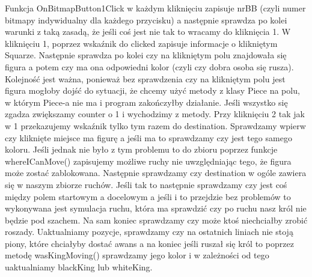 \documentclass[]{report}
\begin{document}
\begin{flushleft}
Funkcja OnBitmapButton1Click w każdym kliknięciu zapisuje nrBB (czyli numer bitmapy indywidualny dla każdego przycisku) a następnie sprawdza po kolei warunki z taką zasadą, że jeśli coś jest nie tak to wracamy do kliknięcia 1. W kliknięciu 1, poprzez wskaźnik do clicked zapisuje informacje o klikniętym Squarze. Następnie sprawdza po kolei czy na klikniętym polu znajdowała się figura a potem czy ma ona odpowiedni kolor (czyli czy dobra osoba się rusza). Kolejność jest ważna, ponieważ bez sprawdzenia czy na klikniętym polu jest figura mogłoby dojść do sytuacji, że chcemy użyć metody z klasy Piece na polu, w którym Piece-a nie ma i program zakończyłby działanie. Jeśli wszystko się zgadza zwiększamy counter o 1 i wychodzimy z metody. Przy kliknięciu 2 tak jak w 1 przekazujemy wskaźnik tylko tym razem do destination. Sprawdzamy wpierw czy kliknięte miejsce ma figurę a jeśli ma to sprawdzamy czy jest tego samego koloru. Jeśli jednak nie było z tym problemu to do zbioru poprzez funkcje whereICanMove() zapisujemy możliwe ruchy nie uwzględniając tego, że figura może zostać zablokowana. Następnie sprawdzamy czy destination w ogóle zawiera się w naszym zbiorze ruchów. Jeśli tak to następnie sprawdzamy czy jest coś między polem startowym a docelowym a jeśli i to przejdzie bez problemów to wykonywana jest symulacja ruchu, która ma sprawdzić czy po ruchu nasz król nie będzie pod szachem. Na sam koniec sprawdzamy czy może ktoś niechciałby zrobić roszady. Uaktualniamy pozycje, sprawdzamy czy na ostatnich liniach nie stoją piony, które chciałyby dostać awans a na koniec jeśli ruszał się król to poprzez metodę wasKingMoving() sprawdzamy jego kolor i w zależności od tego uaktualniamy blackKing lub whiteKing.

\end{flushleft}
\end{document}
